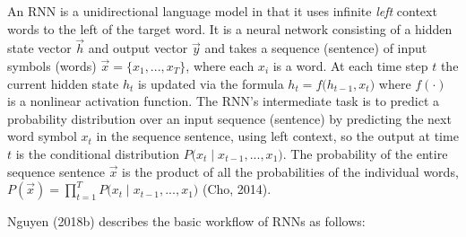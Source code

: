 An RNN is a unidirectional language model in that it uses infinite \emph{left} context words to the left of the target word. It is a neural network consisting of a hidden state vector $\overrightarrow{h}$ and output vector $\overrightarrow{y}$ and takes a sequence (sentence) of input symbols (words) $\overrightarrow{x} = \{ x_1, ..., x_T\}$, where each $x_i$ is a word. At each time step $t$ the current hidden state $h_t$ is updated via the formula $h_t = f \Big( h_{t-1}, x_t \Big)$ where $f(\cdot)$ is a nonlinear activation function. The RNN's intermediate task is to predict a probability distribution over an input sequence (sentence) by predicting the next word symbol $x_t$ in the sequence sentence, using left context, so the output at time $t$ is the conditional distribution $P \Big(x_t \; | \; x_{t-1}, ..., x_1 \Big)$. The probability of the entire sequence sentence $\overrightarrow{x}$ is the product of all the probabilities of the individual words, $P(\overrightarrow{x}) = \prod_{t=1}^T P \Big(x_t \; | \; x_{t-1}, ..., x_1 \Big)$ (Cho, 2014). 

Nguyen (2018b) describes the basic workflow of RNNs as follows: 

